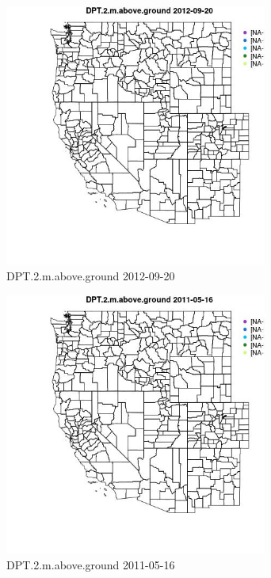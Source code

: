 \begin{figure} 
\centering  
\includegraphics[width=0.77\textwidth]{Code_Outputs/ML_input_report_ML_input_PM25_Step5_part_d_de_duplicated_aves_ML_input_MapObsDPT2maboveground2012-09-20.jpg} 
\caption{\label{fig:ML_input_report_ML_input_PM25_Step5_part_d_de_duplicated_aves_ML_inputMapObsDPT2maboveground2012-09-20}DPT.2.m.above.ground 2012-09-20} 
\end{figure} 
 

\begin{figure} 
\centering  
\includegraphics[width=0.77\textwidth]{Code_Outputs/ML_input_report_ML_input_PM25_Step5_part_d_de_duplicated_aves_ML_input_MapObsDPT2maboveground2011-05-16.jpg} 
\caption{\label{fig:ML_input_report_ML_input_PM25_Step5_part_d_de_duplicated_aves_ML_inputMapObsDPT2maboveground2011-05-16}DPT.2.m.above.ground 2011-05-16} 
\end{figure} 
 

